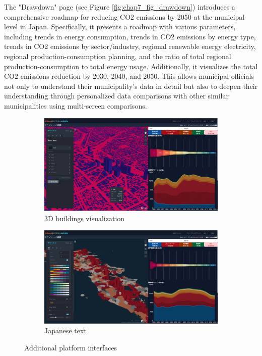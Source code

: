 The "Drawdown" page (see Figure \ref{fig:chap7_fig_drawdown}) introduces a comprehensive roadmap for reducing CO2 emissions by 2050 at the municipal level in Japan. Specifically, it presents a roadmap with various parameters, including trends in energy consumption, trends in CO2 emissions by energy type, trends in CO2 emissions by sector/industry, regional renewable energy electricity, regional production-consumption planning, and the ratio of total regional production-consumption to total energy usage. Additionally, it visualizes the total CO2 emissions reduction by 2030, 2040, and 2050. This allows municipal officials not only to understand their municipality's data in detail but also to deepen their understanding through personalized data comparisons with other similar municipalities using multi-screen comparisons. \par

\begin{figure}[tbh!]
  \centering
  \begin{subfigure}{.5\textwidth}
      \centering
      \includegraphics[width=.9\textwidth]{figs/chap7/3d_bldg.png}
      \caption{3D buildings visualization}
  \end{subfigure}%
  \begin{subfigure}{.5\textwidth}
      \centering
      \includegraphics[width=.9\textwidth]{figs/chap7/3d_ja.png}
      \caption{Japanese text}
  \end{subfigure}
  \caption{Additional platform interfaces}
  \label{fig:chap7_fig_other_interface}
\end{figure}

